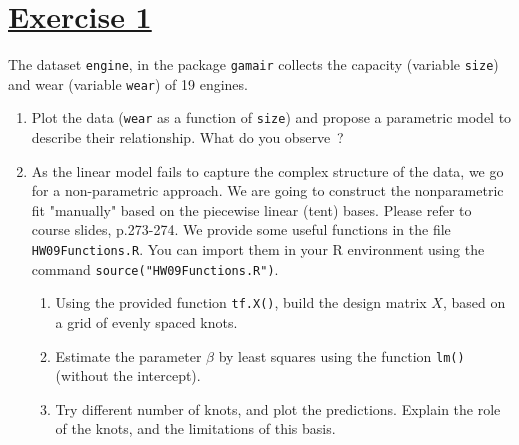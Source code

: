 \documentclass[a4paper,12pt]{article}\usepackage[]{graphicx}\usepackage[]{color}
\begin{document}

\begin{center}
\bigskip

\bigskip

\bigskip

\bigskip

\bigskip

\bigskip


\bigskip

\bigskip

\bigskip
\end{center}



\setlength{\parskip}{1ex plus 0.5ex minus 0.2ex}
\parindent=0cm
\setlength{\parskip}{1ex plus 0.5ex minus 0.2ex}
\linespread{1.1}



\section{\underline{Exercise 1}} \label{ex1}

The dataset \verb"engine", in the package \texttt{gamair} collects the capacity (variable \texttt{size}) and wear (variable \texttt{wear}) of 19 engines.

\begin{enumerate}[label=\textbf{\alph*})]
\item Plot the data (\texttt{wear} as a function of \texttt{size}) and propose a parametric model to describe their relationship. What do you observe~?
\item As the linear model fails to capture the complex structure of the data, we go for a non-parametric approach. We are going to construct the nonparametric fit "manually" based on the piecewise linear (tent) bases. Please refer to course slides, p.273-274. We provide some useful functions in the file \verb"HW09Functions.R". You can import them in your R environment using the command \texttt{source("HW09Functions.R")}. 

\begin{enumerate}[label=\arabic*)]
\item Using the provided function \texttt{tf.X()}, build the design matrix $X$, based on a grid of evenly spaced knots.
\item Estimate the parameter $\beta$ by least squares using the function \verb"lm()" (without the intercept).
\item Try different number of knots, and plot the predictions. Explain the role of the knots, and the limitations of this basis.
\end{enumerate}

\end{enumerate}
\end{document}
